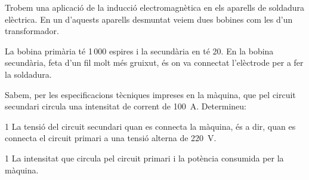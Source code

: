 Trobem una aplicació de la inducció electromagnètica en els aparells de soldadura elèctrica. En un d'aquests aparells desmuntat veiem dues bobines com les d'un transformador.

La bobina primària té 1\,000 espires i la secundària en té 20. En la bobina secundària, feta d'un fil molt més gruixut, és on va connectat l'elèctrode per a fer la soldadura.

Sabem, per les especificacions tècniques impreses en la màquina, que pel circuit secundari circula una intensitat de corrent de 100~A. Determineu:

\begin{apartat}{1}
La tensió del circuit secundari quan es connecta la màquina, és a dir, quan es connecta el circuit primari a una tensió alterna de 220~V.
\end{apartat}

\begin{apartat}{1}
La intensitat que circula pel circuit primari i la potència consumida per la màquina.
\end{apartat}

